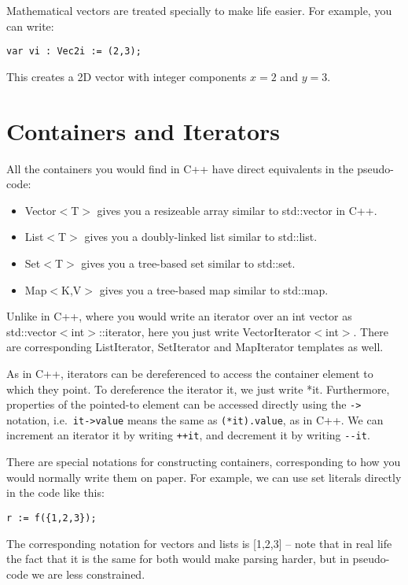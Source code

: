 Mathematical vectors are treated specially to make life easier. For example, you can write:
%
\begin{lstlisting}[style=Snippet]
var vi : Vec2i := (2,3);
\end{lstlisting}
%
This creates a 2D vector with integer components $x = 2$ and $y = 3$.

\section{Containers and Iterators}

All the containers you would find in C++ have direct equivalents in the pseudo-code:
%
\begin{itemize}
\item Vector$<$T$>$ gives you a resizeable array similar to std::vector in C++.
\item List$<$T$>$ gives you a doubly-linked list similar to std::list.
\item Set$<$T$>$ gives you a tree-based set similar to std::set.
\item Map$<$K,V$>$ gives you a tree-based map similar to std::map.
\end{itemize}
%
Unlike in C++, where you would write an iterator over an int vector as std::vector$<$int$>$::iterator, here you just write VectorIterator$<$int$>$. There are corresponding ListIterator, SetIterator and MapIterator templates as well.

As in C++, iterators can be dereferenced to access the container element to which they point. To dereference the iterator it, we just write *it. Furthermore, properties of the pointed-to element can be accessed directly using the \lstinline[language=Pseudocode]$->$ notation, i.e.~\lstinline[language=Pseudocode]$it->value$ means the same as \lstinline[language=Pseudocode]$(*it).value$, as in C++. We can increment an iterator it by writing \lstinline[language=Pseudocode]$++it$, and decrement it by writing \lstinline[language=Pseudocode]$--it$.

There are special notations for constructing containers, corresponding to how you would normally write them on paper. For example, we can use set literals directly in the code like this:
%
\begin{lstlisting}[style=Snippet]
r := f({1,2,3});
\end{lstlisting}
%
The corresponding notation for vectors and lists is [1,2,3] -- note that in real life the fact that it is the same for both would make parsing harder, but in pseudo-code we are less constrained.


